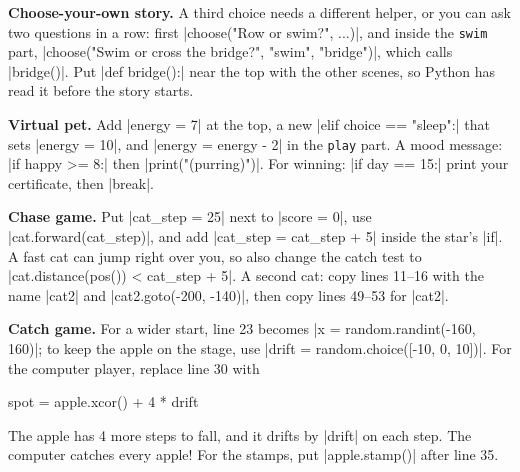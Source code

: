 \textbf{Choose-your-own story.} A third choice needs a different helper, or you can ask two questions in a row: first \py|choose("Row or swim?", ...)|, and inside the \texttt{swim} part, \py|choose("Swim or cross the bridge?", "swim", "bridge")|, which calls \py|bridge()|. Put \py|def bridge():| near the top with the other scenes, so Python has read it before the story starts.

\textbf{Virtual pet.} Add \py|energy = 7| at the top, a new \py|elif choice == "sleep":| that sets \py|energy = 10|, and \py|energy = energy - 2| in the \texttt{play} part. A mood message: \py|if happy >= 8:| then \py|print("(purring)")|. For winning: \py|if day == 15:| print your certificate, then \py|break|.

\textbf{Chase game.} Put \py|cat_step = 25| next to \py|score = 0|, use \py|cat.forward(cat_step)|, and add \py|cat_step = cat_step + 5| inside the star's \py|if|. A fast cat can jump right over you, so also change the catch test to \py|cat.distance(pos()) < cat_step + 5|. A second cat: copy lines 11--16 with the name \py|cat2| and \py|cat2.goto(-200, -140)|, then copy lines 49--53 for \py|cat2|.

\textbf{Catch game.} For a wider start, line 23 becomes \py|x = random.randint(-160, 160)|; to keep the apple on the stage, use \py|drift = random.choice([-10, 0, 10])|. For the computer player, replace line 30 with
\begin{codenonum}
    spot = apple.xcor() + 4 * drift
\end{codenonum}
The apple has 4 more steps to fall, and it drifts by \py|drift| on each step. The computer catches every apple! For the stamps, put \py|apple.stamp()| after line 35.
